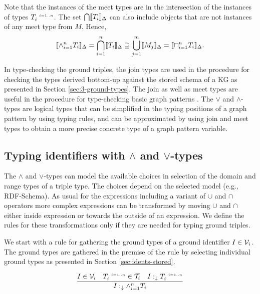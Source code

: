 \documentclass[runningheads]{llncs}
\newcommand{\s}{\scriptscriptstyle\ \,}
\newcommand{\darr}{\downarrow}
\newcommand{\llb}{\llbracket}
\newcommand{\rrb}{\rrbracket}
\newcommand{\V}{{\cal V}}
\newcommand{\T}{{\cal T}}
\newcommand{\memo}[1]{}
\begin{document}
Note that the instances of the meet types
are in the intersection of the instances of types
$T_i^{\s\/i=1..n}$. The set $\bigcap\/\llb\/T_i\rrb_\D$ can also
include objects that are not instances of any meet type from
$M$. Hence,
$$\llb\land_{i=1}^n\/T_i\rrb_\D=\bigcap_{i=1}^n\llb\/T_i\rrb_\D\supseteq\bigcup_{j=1}^m\llb\/M_j\rrb_\D=\llb\sqcap_{i=1}^n\/T_i\rrb_\D.$$

In type-checking the ground triples, the join types are used in the
procedure for checking the types derived bottom-up against the stored
schema of a KG as presented in Section \ref{sec:3-ground-types}. The
join as well as meet types are useful in the procedure for
type-checking basic graph patterns \cite{Savnik2025a}. The $\lor$ and
$\land$-types are logical types that can be simplified in the typing
positions of a graph pattern by using typing rules, and can be
approximated by using join and meet types to obtain a more precise
concrete type of a graph pattern variable.




\subsection{Typing identifiers with $\land$ and $\lor$-types}

The $\land$ and $\lor$-types can model the available choices in
selection of the domain and range types of a triple type. The choices
depend on the selected model (e.g., RDF-Schema). As usual for the
expressions including a variant of $\cup$ and $\cap$ operators more
complex expressions can be transformed by moving $\cup$ and $\cap$
either inside expression or towards the outside of an expression. We
define the rules for these transformations only if they are needed for
typing ground triples.

We start with a rule for gathering the ground types of a ground
identifier $I\in\V_i$. The ground types are gathered in the premise of
the rule by selecting individual ground types as presented in Section
\ref{sec:idents-stored}.

\begin{equation}
\label{rul:land-1}
\dfrac{I\in\V_i\quad\/T_i^{\s\/i=1..n}\in\T_i\quad\/I:_{\darr}T_i^{\s\/i=1..n}}
      {I:_{\darr}\land_{i=1}^n\/T_i}
\end{equation}

\memo{
Let's have a look at $\land$-type composed of $I$'s ground types
$T_i^{\s\/i=1..n}$ in the case $I\in\V_i$. In Yago \cite{Hoffart2013},
often $I$ has a set of very specific classes $T_s$ but also some
general classes $C_g$. The general classes $C_g$ are close to the
classes used in the schema triple types. If stored typing of $V$ is
correct, then $C_g$ includes the classes that are supertypes of
classes from $C_s$.}
\end{document}

